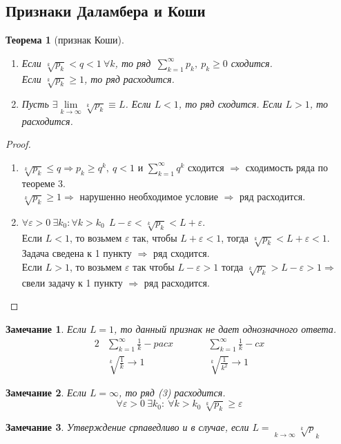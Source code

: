 \documentclass[12pt, oneside]{article}
\theoremstyle{plain}
\newtheorem{Theorem}{Теорема}
\newtheorem{Note}{Замечание}
\DeclareMathOperator*{\uplim}{\overline{lim}}
\begin{document}
	\subsection{Признаки Даламбера и Коши}
	\begin{Theorem}
		[признак Коши]\

		\begin{enumerate}
			\item Если $\sqrt[k]{p_{k}}< q < 1\ \forall k$, то ряд\  $\sum\limits_{k =
				1}^{\infty}p_{k},\ p_{k} \geqslant 0$ сходится.\\
				Если $\sqrt[k]{p_{k}}\geqslant 1$, то ряд расходится.

			\item Пусть $\exists \lim\limits_{k\to\infty}\sqrt[k]{p_{k}}\equiv L$.
				Если $L < 1$, то ряд сходится. Если $L > 1$, то расходится.
		\end{enumerate}
	\end{Theorem}
	\begin{proof}
		\

		\begin{enumerate}
			\item $\sqrt[k]{p_{k}}\leqslant q \Rightarrow p_{k} \geqslant q^{k},\ q < 1$
				и $\sum\limits_{k=1}^{\infty}q^{k}$ сходится $\Rightarrow$ сходимость ряда
				по теореме 3.\\
				$\sqrt[k]{p_{k}}\geqslant 1 \Rightarrow$ нарушенно необходимое условие
				$\Rightarrow$ ряд расходится.

			\item $\forall \varepsilon > 0 \ \exists k_{0} : \forall k > k_{0} \ \
 L-\varepsilon
				<\sqrt[k]{p_{k}}<L+\varepsilon$. \\
				Если $L < 1$, то возьмем $\varepsilon$ так, чтобы $L + \varepsilon < 1$,
				тогда $\sqrt[k]{p_{k}}< L + \varepsilon < 1$. Задача сведена к 1 пункту
				$\Rightarrow$ ряд сходится.\\
				Если $L > 1$, то возьмем $\varepsilon$ так чтобы $L - \varepsilon > 1$ тогда
				$\sqrt[k]{p_{k}}> L - \varepsilon > 1 \Rightarrow$ свели задачу к 1 пункту
				$\Rightarrow$ ряд расходится.
		\end{enumerate}
	\end{proof}
	\begin{Note}
		Если $L = 1$, то данный признак не дает однозначного ответа.
		\begin{alignat*}
			{2} & \sum_{k = 1}^{\infty}\frac{1}{k}- pacx & \qquad & \sum_{k = 1}^{\infty}\frac{1}{k}- cx \\
			    & \sqrt[k]{\frac{1}{k}}\to 1             & \qquad & \sqrt[k]{\frac{1}{k ^ 2}}\to 1
		\end{alignat*}
	\end{Note}
	\begin{Note}
		Если $L = \infty$, то ряд (3) расходится.
		\[
			\forall \varepsilon > 0 \ \exists k_{0}: \ \forall k > k_{0} \ \sqrt[k]{p_{k}}
			\geqslant \varepsilon
		\]
	\end{Note}
	\begin{Note}
		Утверждение српаведливо и в случае, если
		$L = \uplim\limits_{k\to\infty}\sqrt[k]{p}_{k}$
	\end{Note}
\end{document}
